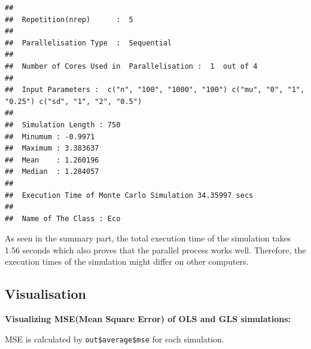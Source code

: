 \documentclass[11pt,a4paper]{article}
\begin{document}
\begin{verbatim}
## 
##  Repetition(nrep)      :  5 
## 
##  Parallelisation Type  :  Sequential 
## 
##  Number of Cores Used in  Parallelisation :  1  out of 4 
## 
##  Input Parameters :  c("n", "100", "1000", "100") c("mu", "0", "1", "0.25") c("sd", "1", "2", "0.5") 
## 
##  Simulation Length : 750 
##  Minumum : -0.9971 
##  Maximum : 3.383637 
##  Mean    : 1.260196 
##  Median  : 1.284057 
## 
##  Execution Time of Monte Carlo Simulation 34.35997 secs 
## 
##  Name of The Class : Eco
\end{verbatim}

As seen in the summary part, the total execution time of the simulation
takes 1.56 seconds which also proves that the parallel process works
well. Therefore, the execution times of the simulation might differ on
other computers.

\hypertarget{visualisation}{%
\subsection{Visualisation}\label{visualisation}}

\textbf{Visualizing MSE(Mean Square Error) of OLS and GLS simulations:}

MSE is calculated by \texttt{out\$average\$mse} for each simulation.
\end{document}
